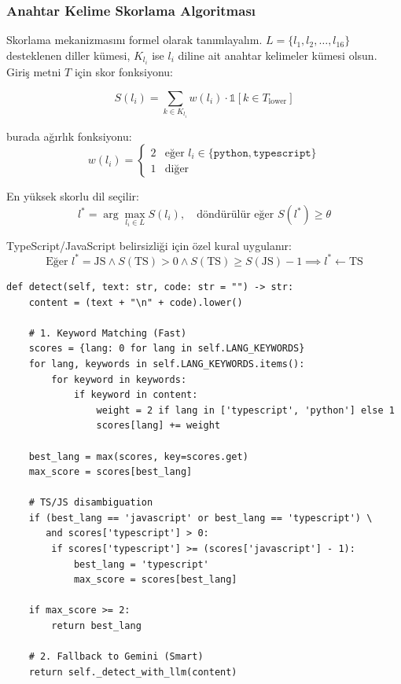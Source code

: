 \documentclass[12pt,a4paper]{article}
\begin{document}
\subsubsection{Anahtar Kelime Skorlama Algoritması}

Skorlama mekanizmasını formel olarak tanımlayalım. $L = \{l_1, l_2, \ldots, l_{16}\}$ desteklenen diller kümesi, $K_{l_i}$ ise $l_i$ diline ait anahtar kelimeler kümesi olsun. Giriş metni $T$ için skor fonksiyonu:

\begin{equation}
    S(l_i) = \sum_{k \in K_{l_i}} w(l_i) \cdot \mathbb{1}[k \in T_{\text{lower}}]
\end{equation}

burada ağırlık fonksiyonu:
\begin{equation}
    w(l_i) = \begin{cases} 2 & \text{eğer } l_i \in \{\texttt{python}, \texttt{typescript}\} \\ 1 & \text{diğer} \end{cases}
\end{equation}

En yüksek skorlu dil seçilir:
\begin{equation}
    l^* = \arg\max_{l_i \in L} S(l_i), \quad \text{döndürülür eğer } S(l^*) \geq \theta
\end{equation}

TypeScript/JavaScript belirsizliği için özel kural uygulanır:
\begin{equation}
    \text{Eğer } l^* = \mathrm{JS} \wedge S(\mathrm{TS}) > 0 \wedge S(\mathrm{TS}) \geq S(\mathrm{JS}) - 1 \implies l^* \leftarrow \mathrm{TS}
\end{equation}

\begin{lstlisting}[style=pythonstyle, caption={LanguageDetector.detect() --- Hibrit Algılama (language-detector.py)}, label=lst:lang-detect]
def detect(self, text: str, code: str = "") -> str:
    content = (text + "\n" + code).lower()
    
    # 1. Keyword Matching (Fast)
    scores = {lang: 0 for lang in self.LANG_KEYWORDS}
    for lang, keywords in self.LANG_KEYWORDS.items():
        for keyword in keywords:
            if keyword in content:
                weight = 2 if lang in ['typescript', 'python'] else 1
                scores[lang] += weight
    
    best_lang = max(scores, key=scores.get)
    max_score = scores[best_lang]
    
    # TS/JS disambiguation
    if (best_lang == 'javascript' or best_lang == 'typescript') \
       and scores['typescript'] > 0:
        if scores['typescript'] >= (scores['javascript'] - 1):
            best_lang = 'typescript'
            max_score = scores[best_lang]
    
    if max_score >= 2:
        return best_lang
        
    # 2. Fallback to Gemini (Smart)
    return self._detect_with_llm(content)
\end{lstlisting}
\end{document}
